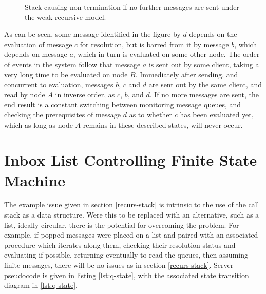 \documentclass[a4paper,10pt]{article}
\begin{document}
\begin{figure}
	\centering
	\begin{drawstack}
		\startframe
		\startframe
		\startframe
	\end{drawstack}
	\caption{\label{fig:deps-block-stack}Stack causing non-termination if
	no further messages are sent under the weak recursive model.} 
\end{figure}

As can be seen, some message identified in the figure by \(d\) depends on the
evaluation of message \(c\) for resolution, but is barred from it by message
\(b\), which depends on message \(a\), which in turn is evaluated on some other
node.
The order of events in the system follow that message \(a\) is sent out by some
client, taking a very long time to be evaluated on node \(B\).
Immediately after sending, and concurrent to evaluation, messages \(b\), \(c\)
and \(d\) are sent out by the same client, and read by node \(A\) in inverse
order, as \(c\), \(b\), and \(d\).
If no more messages are sent, the end result is a constant switching between
monitoring message queues, and checking the prerequisites of message \(d\) as
to whether \(c\) has been evaluated yet, which as long as node \(A\) remains in
these described states, will never occur.

\section{Inbox List Controlling Finite State Machine}
\label{inbox-list}

The example issue given in section \ref{recurs-stack} is intrinsic to the use
of the call stack as a data structure.
Were this to be replaced with an alternative, such as a list, ideally circular,
there is the potential for overcoming the problem.
For example, if popped messages were placed on a list and paired with an
associated procedure which iterates along them, checking their resolution
status and evaluating if possible, returning eventually to read the queues,
then assuming finite messages, there will be no issues as in section
\ref{recurs-stack}.
Server pseudocode is given in listing \ref{lst:q-state}, with the associated
state transition diagram in \ref{lst:q-state}.
\end{document}
